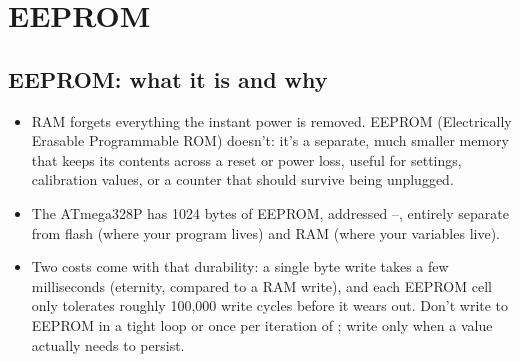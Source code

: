 
\section{EEPROM}
\label{c7:sec:eeprom}\label{c7:app:a}

\subsection{EEPROM: what it is and why}
\label{c7:a:1}
\begin{itemize}
  \item RAM forgets everything the instant power is removed. EEPROM (Electrically Erasable
    Programmable ROM) doesn't: it's a separate, much smaller memory that keeps its contents across
    a reset or power loss, useful for settings, calibration values, or a counter that should survive
    being unplugged.
  \item The ATmega328P has 1024 bytes of EEPROM, addressed --, entirely separate
    from flash (where your program lives) and RAM (where your variables live).
  \item Two costs come with that durability: a single byte write takes a few milliseconds
    (eternity, compared to a RAM write), and each EEPROM cell only tolerates roughly 100,000 write
    cycles before it wears out. Don't write to EEPROM in a tight loop or once per iteration of
    ; write only when a value actually needs to persist.
\end{itemize}


